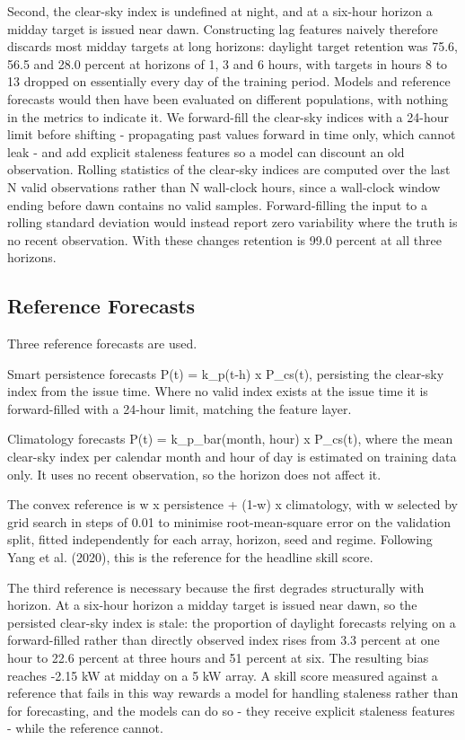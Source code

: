 Second, the clear-sky index is undefined at night, and at a six-hour
horizon a midday target is issued near dawn. Constructing lag features
naively therefore discards most midday targets at long horizons: daylight
target retention was 75.6, 56.5 and 28.0 percent at horizons of 1, 3 and
6 hours, with targets in hours 8 to 13 dropped on essentially every day
of the training period. Models and reference forecasts would then have
been evaluated on different populations, with nothing in the metrics to
indicate it. We forward-fill the clear-sky indices with a 24-hour limit
before shifting - propagating past values forward in time only, which
cannot leak - and add explicit staleness features so a model can
discount an old observation. Rolling statistics of the clear-sky indices
are computed over the last N valid observations rather than N wall-clock
hours, since a wall-clock window ending before dawn contains no valid
samples. Forward-filling the input to a rolling standard deviation would
instead report zero variability where the truth is no recent
observation. With these changes retention is 99.0 percent at all three
horizons.

\subsection{Reference Forecasts}

Three reference forecasts are used.

Smart persistence forecasts P(t) = k\_p(t-h) x P\_cs(t), persisting the
clear-sky index from the issue time. Where no valid index exists at the
issue time it is forward-filled with a 24-hour limit, matching the
feature layer.

Climatology forecasts P(t) = k\_p\_bar(month, hour) x P\_cs(t), where the
mean clear-sky index per calendar month and hour of day is estimated on
training data only. It uses no recent observation, so the horizon does
not affect it.

The convex reference is w x persistence + (1-w) x climatology, with w
selected by grid search in steps of 0.01 to minimise root-mean-square
error on the validation split, fitted independently for each array,
horizon, seed and regime. Following Yang et al. (2020), this is the
reference for the headline skill score.

The third reference is necessary because the first degrades structurally
with horizon. At a six-hour horizon a midday target is issued near dawn,
so the persisted clear-sky index is stale: the proportion of daylight
forecasts relying on a forward-filled rather than directly observed
index rises from 3.3 percent at one hour to 22.6 percent at three hours
and 51 percent at six. The resulting bias reaches -2.15 kW at midday on
a 5 kW array. A skill score measured against a reference that fails in
this way rewards a model for handling staleness rather than for
forecasting, and the models can do so - they receive explicit staleness
features - while the reference cannot.

